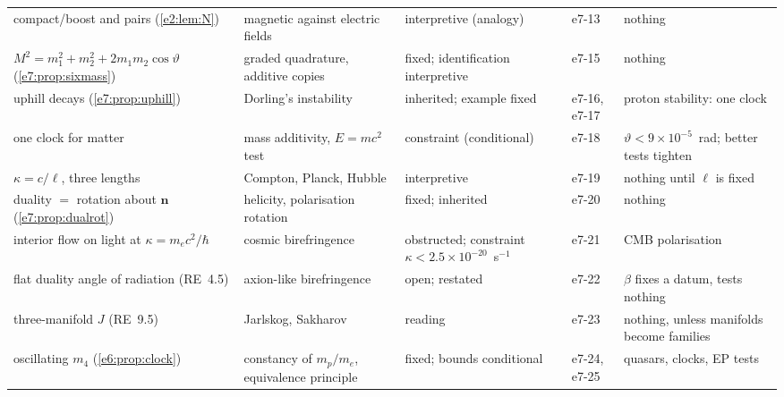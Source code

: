 {\begin{longtable}{@{}>{\raggedright\arraybackslash}p{3.4cm}>{\raggedright\arraybackslash}p{3.2cm}>{\raggedright\arraybackslash}p{2.6cm}>{\raggedright\arraybackslash}p{1.5cm}>{\raggedright\arraybackslash}p{3.5cm}@{}}
compact/boost and pairs (\cref{e2:lem:N}) & magnetic against electric fields & interpretive (analogy) & e7-13 & nothing\\
$M^2=m_1^2+m_2^2+2m_1m_2\cos\vartheta$ (\cref{e7:prop:sixmass}) & graded quadrature, additive copies & fixed; identification interpretive & e7-15 & nothing\\
uphill decays (\cref{e7:prop:uphill}) & Dorling's instability & inherited; example fixed & e7-16, e7-17 & proton stability: one clock\\
one clock for matter & mass additivity, $E=mc^2$ test & constraint (conditional) & e7-18 & $\vartheta<9\times10^{-5}$~rad; better tests tighten\\
$\kappa=c/\ell$, three lengths & Compton, Planck, Hubble & interpretive & e7-19 & nothing until $\ell$ is fixed\\
duality $=$ rotation about $\mathbf n$ (\cref{e7:prop:dualrot}) & helicity, polarisation rotation & fixed; inherited & e7-20 & nothing\\
interior flow on light at $\kappa=m_ec^2/\hbar$ & cosmic birefringence & obstructed; constraint $\kappa<2.5\times10^{-20}$~s$^{-1}$ & e7-21 & CMB polarisation\\
flat duality angle of radiation (RE~4.5) & axion-like birefringence & open; restated & e7-22 & $\beta$ fixes a datum, tests nothing\\
three-manifold $J$ (RE~9.5) & Jarlskog, Sakharov & reading & e7-23 & nothing, unless manifolds become families\\
oscillating $m_4$ (\cref{e6:prop:clock}) & constancy of $m_p/m_e$, equivalence principle & fixed; bounds conditional & e7-24, e7-25 & quasars, clocks, EP tests\\
\end{longtable}}

